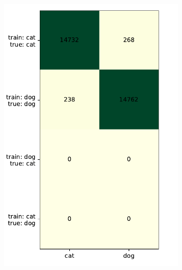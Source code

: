 \documentclass[a4paper,11pt]{scrartcl}
\theoremstyle{definition}
\begin{document}
\begin{figure}[!h]%
	\centering
\centering
\begin{subfigure}[t]{0.32\textwidth}
\includegraphics[width=0.99\textwidth]{Plots_1/compound_3000_00_00_no_Title.pdf}
\end{subfigure}
\begin{subfigure}[t]{0.32\textwidth}

\end{subfigure}
\end{figure}
\end{document}
